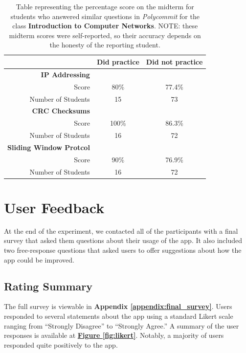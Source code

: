 \begin{table}
	\begin{tabular}[h!]{ r c c }
		& \textbf{Did practice} & \textbf{Did not practice} \\
		\hline
		\textbf{IP Addressing} & & \\
		Score & 80\% & 77.4\%  \\
		Number of Students & 15 & 73 \\
		
		\hline
		\textbf{CRC Checksums} & &  \\
		Score  & 100\% & 86.3\% \\
		Number of Students & 16 & 72 \\
		
		\hline
		\textbf{Sliding Window Protcol} & &  \\
		Score  & 90\% & 76.9\% \\
		Number of Students & 16 & 72 \\
		
	\end{tabular}
\caption{Table representing the percentage score on the midterm for students who answered similar questions in \textit{Polycommit} for the class \textbf{Introduction to Computer Networks}. NOTE: these midterm scores were self-reported, so their accuracy depends on the honesty of the reporting student.}
\end{table}

\section {User Feedback}

\par At the end of the experiment, we contacted all of the participants with a final survey that asked them questions about their usage of the app. It also included two free-response questions that asked users to offer suggestions about how the app could be improved.

\subsection{Rating Summary}

\par The full survey is viewable in \textbf{Appendix \ref{appendix:final_survey}}. Users responded to several statements about the app using a standard Likert scale ranging from ``Strongly Disagree'' to ``Strongly Agree.'' A summary of the user responses is available at \textbf{\hyperref[fig:likert]{Figure \ref*{fig:likert}}}. Notably, a majority of users responded quite positively to the app.


